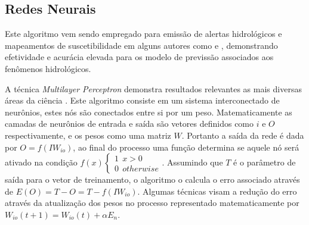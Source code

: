 \subsection{Redes Neurais}
Este algoritmo vem sendo empregado para emissão de alertas hidrológicos e mapeamentos de suscetibilidade em alguns autores como \cite{da2016utilizaccao} e \cite{pacheco2020mapeamento}, demonstrando efetividade e acurácia elevada para os modelo de previssão associados aos fenômenos hidrológicos. 
\par A técnica \textit{Multilayer Perceptron} demonstra resultados relevantes as mais diversas áreas da ciência \cite{gardner1998artificial}. Este algoritmo consiste em um sistema interconectado de neurônios, estes nós são conectados entre si por um peso. Matematicamente as camadas de neurônios de entrada e saída são vetores definidos como $i$ e $O$ respectivamente, e os pesos como uma matriz $W$. Portanto a saída da rede é dada por $O=f(IW_{io})$, ao final do processo uma função determina se aquele nó será ativado na condição $f(x)\begin{cases} 
1 \ \ x>0 \\
0 \ \ otherwise
\end{cases}$. Assumindo que $T$ é o parâmetro de saída para o vetor de treinamento, o algoritmo o calcula o erro associado através de $E(O)=T-O=T-f(IW_{io})$. Algumas técnicas visam a redução do erro através da atualização dos pesos no processo representado matematicamente por $W_{io}(t+1)=W_{io}(t)+\alpha E_n$.


